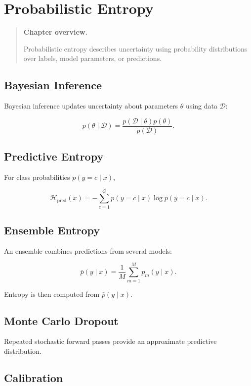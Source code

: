 \documentclass[11pt,oneside]{book}
\theoremstyle{remark}
\newcommand{\Entropy}{\mathcal{H}}
\newenvironment{chapteroverview}
{
	\begin{quote}
		\small
		\textbf{Chapter overview.}
	}
	{
	\end{quote}
}
\begin{document}
	\chapter{Probabilistic Entropy}
	\label{chap:probabilistic-entropy}
	
	\begin{chapteroverview}
		Probabilistic entropy describes uncertainty using probability distributions
		over labels, model parameters, or predictions.
	\end{chapteroverview}
	
	\section{Bayesian Inference}
	
	Bayesian inference updates uncertainty about parameters \(\theta\) using data
	\(\mathcal{D}\):
	
	\[
	p(\theta\mid\mathcal{D})
	=
	\frac{
		p(\mathcal{D}\mid\theta)p(\theta)
	}{
		p(\mathcal{D})
	}.
	\]
	
	\section{Predictive Entropy}
	
	For class probabilities \(p(y=c\mid x)\),
	
	\[
	\Entropy_{\mathrm{pred}}(x)
	=
	-\sum_{c=1}^{C}
	p(y=c\mid x)
	\log p(y=c\mid x).
	\]
	
	\section{Ensemble Entropy}
	
	An ensemble combines predictions from several models:
	
	\[
	\bar{p}(y\mid x)
	=
	\frac{1}{M}
	\sum_{m=1}^{M}
	p_m(y\mid x).
	\]
	
	Entropy is then computed from \(\bar{p}(y\mid x)\).
	
	\section{Monte Carlo Dropout}
	
	Repeated stochastic forward passes provide an approximate predictive
	distribution.
	
	\section{Calibration}
	
\end{document}

